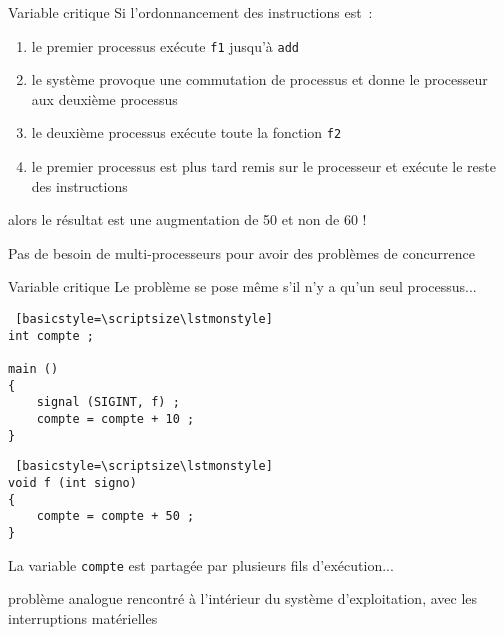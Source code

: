 \begin {frame} {Variable critique}
    Si l'ordonnancement des instructions est~:

    \begin {enumerate}
	\item le premier processus exécute \texttt {f1} jusqu'à \texttt {add}
	\item le système provoque une commutation de processus et donne le
	    processeur aux deuxième processus
	\item le deuxième processus exécute toute la fonction \texttt {f2}
	\item le premier processus est plus tard remis sur le processeur
	    et exécute le reste des instructions
    \end {enumerate}
    \implique alors le résultat est une augmentation de 50 et non de 60 !

    \vspace* {5mm}

    Pas de besoin de multi-processeurs pour avoir des problèmes de
    concurrence

\end {frame}

\begin {frame} [fragile] {Variable critique}
    Le problème se pose même s'il n'y a qu'un seul processus...

\begin {minipage} {.45\textwidth}
\begin {lstlisting} [basicstyle=\scriptsize\lstmonstyle]
int compte ;

main ()
{
    signal (SIGINT, f) ;
    compte = compte + 10 ;
}
\end{lstlisting}
\end {minipage}
\hfill
\begin {minipage} {.45\textwidth}
\begin {lstlisting} [basicstyle=\scriptsize\lstmonstyle]
void f (int signo)
{
    compte = compte + 50 ;
}
\end{lstlisting}
\end {minipage}

    La variable \texttt {compte} est partagée par plusieurs fils
    d'exécution...

    \vspace* {7mm}

    \implique problème analogue rencontré à l'intérieur du système
    d'exploitation, avec les interruptions matérielles

\end{frame}


